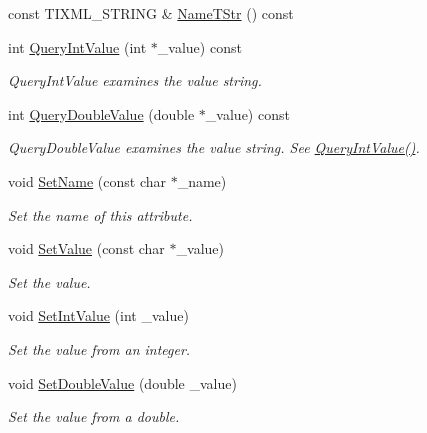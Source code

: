 \begin{DoxyCompactItemize}
const TIXML\_\-STRING \& \hyperlink{classTiXmlAttribute_a64cee17bceb8232eb0736d26dd082d79}{NameTStr} () const 
\item 
int \hyperlink{classTiXmlAttribute_ad6c93088ee21af41a107931223339344}{QueryIntValue} (int $\ast$\_\-value) const 
\begin{DoxyCompactList}\small\item\em QueryIntValue examines the value string. \item\end{DoxyCompactList}\item 
int \hyperlink{classTiXmlAttribute_ac87b2a8489906a5d7aa2875f20be3513}{QueryDoubleValue} (double $\ast$\_\-value) const 
\begin{DoxyCompactList}\small\item\em QueryDoubleValue examines the value string. See \hyperlink{classTiXmlAttribute_ad6c93088ee21af41a107931223339344}{QueryIntValue()}. \item\end{DoxyCompactList}\item 
void \hyperlink{classTiXmlAttribute_ab7fa3d21ff8d7c5764cf9af15b667a99}{SetName} (const char $\ast$\_\-name)
\begin{DoxyCompactList}\small\item\em Set the name of this attribute. \item\end{DoxyCompactList}\item 
void \hyperlink{classTiXmlAttribute_a2dae44178f668b3cb48101be4f2236a0}{SetValue} (const char $\ast$\_\-value)
\begin{DoxyCompactList}\small\item\em Set the value. \item\end{DoxyCompactList}\item 
void \hyperlink{classTiXmlAttribute_a7e065df640116a62ea4f4b7da5449cc8}{SetIntValue} (int \_\-value)
\begin{DoxyCompactList}\small\item\em Set the value from an integer. \item\end{DoxyCompactList}\item 
void \hyperlink{classTiXmlAttribute_a0316da31373496c4368ad549bf711394}{SetDoubleValue} (double \_\-value)
\begin{DoxyCompactList}\small\item\em Set the value from a double. \item\end{DoxyCompactList}\item 

\end{DoxyCompactItemize}
